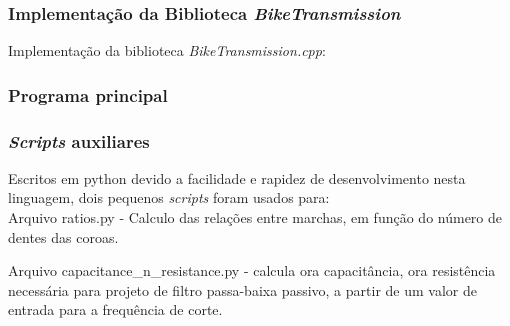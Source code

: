 \documentclass[a4paper,11pt]{article}
\begin{document}
\subsubsection{Implementação da Biblioteca \textit{BikeTransmission}}
\label{code:impl}
Implementação da biblioteca \textit{BikeTransmission.cpp}:


\subsubsection{Programa principal}
\label{code:main}


\subsubsection{\textit{Scripts} auxiliares}
\label{code:helper_scripts}


Escritos em python\cite{python} devido a facilidade e rapidez de desenvolvimento nesta linguagem, dois pequenos \textit{scripts} foram usados para: \\
Arquivo ratios.py - Calculo das relações entre marchas, em função do número de dentes das coroas.


Arquivo capacitance\_n\_resistance.py - calcula ora capacitância, ora resistência necessária para projeto de filtro passa-baixa passivo, a partir de um valor de entrada para a frequência de corte.




\pagebreak
%


\end{document}
